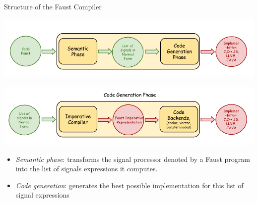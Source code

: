 
\begin{frame}{Structure of the Faust Compiler}{}

    \begin{center}
        \includegraphics[width=0.80\columnwidth]{images/compilation-chain-3}

        \includegraphics[width=0.80\columnwidth]{images/code-generation-chain}
    \end{center}

    \begin{itemize}
    \item \emph{Semantic phase}: transforms the signal processor denoted by a Faust program into the list of signals expressions it computes.
    \item \emph{Code generation}: generates the best possible implementation for this list of signal expressions
    \end{itemize}
\end{frame}
